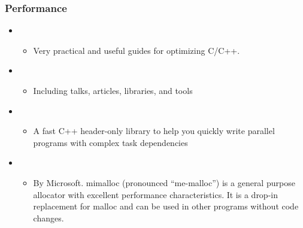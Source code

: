 \documentclass[letterpaper,10pt,english]{sphinxmanual}
\begin{document}
\subsubsection{Performance}
\label{\detokenize{resource/programing/cpp_basic:performance}}\begin{itemize}
\item {} 
\begin{itemize}
\item {} 
Very practical and useful guides for optimizing C/C++.

\end{itemize}

\item {} 
\begin{itemize}
\item {} 
Including talks, articles, libraries, and tools

\end{itemize}

\item {} 
\begin{itemize}
\item {} 
A fast C++ header-only library to help you quickly write parallel
programs with complex task dependencies

\end{itemize}

\item {} 
\begin{itemize}
\item {} 
By Microsoft. mimalloc (pronounced “me-malloc”) is a general
purpose allocator with excellent performance characteristics. It
is a drop-in replacement for malloc and can be used in other
programs without code changes.

\end{itemize}

\end{itemize}
\end{document}
